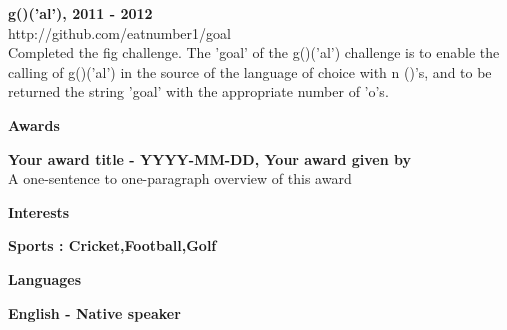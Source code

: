 \documentclass[a4paper,12pt,final]{memoir}
\newcommand{\SmallSep}{\vspace{0.5em}}
\newcommand{\CVSection}[1]
	{\Large\textbf{ #1}\par
	\SmallSep\normalsize\normalfont}
\newcommand{\CVItem}[1]
	{\textbf{\color{RoyalBlue} #1}}
\begin{document}
    \CVItem{ g()('al'),  2011 - 2012 } \\
    http://github.com/eatnumber1/goal \\
    Completed the fig challenge. The 'goal' of the g()('al') challenge is to enable the calling of g()('al') in the source of the language of choice with n ()'s, and to be returned the string 'goal' with the appropriate number of 'o's.
    \SmallSep


\CVSection{Awards}

    \CVItem{ Your award title - YYYY-MM-DD, Your award given by }\\
    A one-sentence to one-paragraph overview of this award
    \SmallSep


\CVSection{Interests}

    \CVItem{ Sports : Cricket,Football,Golf }\\
    \SmallSep


\CVSection{Languages}

    \CVItem{ English - Native speaker }\\
    \SmallSep


\end{document}
